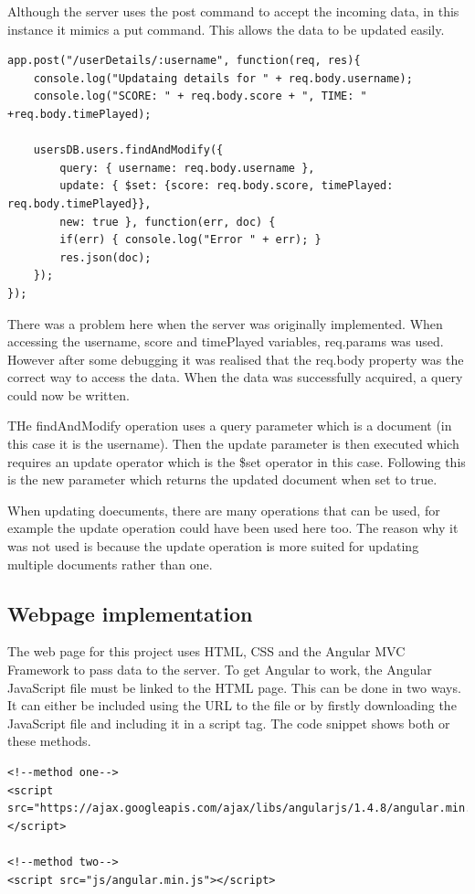 \documentclass[12pt]{article}
\begin{document}
Although the server uses the post command to accept the incoming data, in this instance it mimics a put command. This allows the data to be updated easily. 

\begin{lstlisting}
app.post("/userDetails/:username", function(req, res){
    console.log("Updataing details for " + req.body.username);
    console.log("SCORE: " + req.body.score + ", TIME: " +req.body.timePlayed);

    usersDB.users.findAndModify({
        query: { username: req.body.username },
        update: { $set: {score: req.body.score, timePlayed: req.body.timePlayed}},
        new: true }, function(err, doc) {
        if(err) { console.log("Error " + err); }
        res.json(doc);
    });
});
\end{lstlisting}

There was a problem here when the server was originally implemented. When accessing the username, score and timePlayed variables, req.params was used. However after some debugging it was realised that the req.body property was the correct way to access the data. When the data was successfully acquired, a query could now be written. 

THe findAndModify operation uses a query parameter which is a document (in this case it is the username). Then the update parameter is then executed which requires an update operator which is the {\$}set operator in this case. Following this is the new parameter which returns the updated document when set to true. 

When updating doecuments, there are many operations that can be used, for example the update operation could have been used here too. The reason why it was not used is because the update operation is more suited for updating multiple documents rather than one. 

\subsection{Webpage implementation}
The web page for this project uses HTML, CSS and the Angular MVC Framework to pass data to the server. To get Angular to work, the Angular JavaScript file must be linked to the HTML page. This can be done in two ways. It can either be included using the URL to the file or by firstly downloading the JavaScript file and including it in a script tag. The code snippet shows both or these methods. 

\begin{lstlisting}
<!--method one-->
<script src="https://ajax.googleapis.com/ajax/libs/angularjs/1.4.8/angular.min.js">
</script>

<!--method two-->
<script src="js/angular.min.js"></script>
\end{lstlisting}
\end{document}
